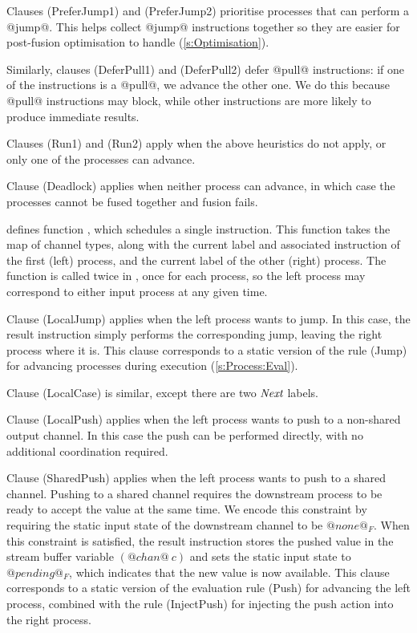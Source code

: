 Clauses (PreferJump1) and (PreferJump2) prioritise processes that can perform a @jump@.
This helps collect @jump@ instructions together so they are easier for post-fusion optimisation to handle (\cref{s:Optimisation}).

Similarly, clauses (DeferPull1) and (DeferPull2) defer @pull@ instructions: if one of the instructions is a @pull@, we advance the other one. We do this because @pull@ instructions may block, while other instructions are more likely to produce immediate results.

Clauses (Run1) and (Run2) apply when the above heuristics do not apply, or only one of the processes can advance.

Clause (Deadlock) applies when neither process can advance, in which case the processes cannot be fused together and fusion fails.




\smallskip
{} defines function , which schedules a single instruction.
This function takes the map of channel types, along with the current label and associated instruction of the first (left) process, and the current label of the other (right) process.
The  function is called twice in , once for each process, so the left process may correspond to either input process at any given time.


Clause (LocalJump) applies when the left process wants to jump.
In this case, the result instruction simply performs the corresponding jump, leaving the right process where it is.
This clause corresponds to a static version of the rule (Jump) for advancing processes during execution (\cref{s:Process:Eval}).

Clause (LocalCase) is similar, except there are two $\textit{Next}$ labels.

Clause (LocalPush) applies when the left process wants to push to a non-shared output channel.
In this case the push can be performed directly, with no additional coordination required.

Clause (SharedPush) applies when the left process wants to push to a shared channel.
Pushing to a shared channel requires the downstream process to be ready to accept the value at the same time.
We encode this constraint by requiring the static input state of the downstream channel to be $@none@_F$.
When this constraint is satisfied, the result instruction stores the pushed value in the stream buffer variable $(@chan@~c)$ and sets the static input state to $@pending@_F$, which indicates that the new value is now available.
This clause corresponds to a static version of the evaluation rule (Push) for advancing the left process, combined with the rule (InjectPush) for injecting the push action into the right process.

